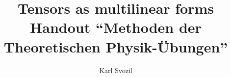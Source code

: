\documentclass[prl,preprint,amsfonts,12pt]{revtex4}
\usepackage{graphicx}
 \RequirePackage{times}
\RequirePackage{courier}
\RequirePackage{mathptm}






\title{Tensors as  multilinear forms\\
Handout ``Methoden der Theoretischen Physik-\"Ubungen''}
\author{Karl Svozil}

\begin{abstract}
Tensors are defined as multilinear forms on vector spaces
\end{abstract}



\maketitle


\section{Notation}

Consider the vector space ${\Bbb R}^D$ of dimension $D$,
a basis
${\mathfrak B}=\{{\bf e}_1,{\bf e}_2,\ldots ,{\bf e}_D\}$ consisting of
$D$ basis vectors ${\bf e}_i$,
and $n$ arbitrary vectors
$x_1,x_2,\ldots ,x_n^D$
with vector components
$X^i_1,X^i_2,\ldots ,X^i_n$.

{\em Tensor fields} define tensors in every point of ${\Bbb R}^D$ separately.
In general, with respect to a particular basis, the components of a tensor field
depend on the coordinates.


We adopt Einstein's summation convention to sum over equal indices
(one pair with a superscript and a subscript).
Sometimes, sums are written out explicitly.


